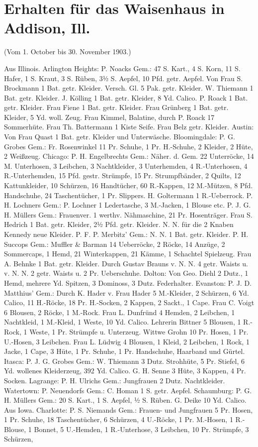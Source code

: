 \chapter[Waisenhaus in Addison]{Erhalten für das Waisenhaus in Addison, Ill.}

(Vom 1. October bis 30. November 1903.)

Aus Illinois. Arlington Heights: P. Noacks Gem.: 47 S. Kart., 4 S. Korn, 11 S. Hafer, 1 S. Kraut, 3 S. Rüben, 3½ S. Aepfel, 10 Pfd. getr. Aepfel. Von Frau S. Brockmann 1 Bat. getr. Kleider. Versch. Gl. 5 Pak. getr. Kleider. W. Thiemann 1 Bat. getr. Kleider. J. Kölling 1 Bat. getr. Kleider, 8 Yd. Calico. P. Roack 1 Bat. getr. Kleider. Frau Fiene 1 Bat. getr. Kleider. Frau Grünberg 1 Bat. getr. Kleider, 5 Yd. woll. Zeug. Frau Kimmel, Balatine, durch P. Roack 17 Sommerhüte. Frau Th. Battermann 1 Kiste Seife. Frau Belz getr. Kleider. Austin: Von Frau Quast 1 Bat. getr. Kleider und Unterwäsche. Bloomingdale: P. G. Grobes Gem.: Fr. Rosenwinkel 11 Pr. Schuhe, 1 Pr. H.-Schuhe, 2 Kleider, 2 Hüte, 2 Weißzeug. Chicago: P. H. Engelbrechts Gem.: Näher. d. Gem. 22 Unterröcke, 14 M. Unterhosen, 3 Leibchen, 3 Nachtkleider, 3 Unterhemden, 4 R.-Unterhosen, 4 R.-Unterhemden, 15 Pfd. gestr. Strümpfe, 15 Pr. Strumpfbänder, 2 Quilts, 12 Kattunkleider, 10 Schürzen, 16 Handtücher, 60 R.-Kappen, 12 M.-Mützen, 8 Pfd. Handschuhe, 24 Taschentücher, 1 Pr. Slippers. H. Goltermann 1 R.-Ueberrock. P. H. Lochners Gem.: P. Lochner 1 Ledertasche, 3 M.-Jacken, 1 Blouse etc. P. J. G. H. Müllers Gem.: Frauenver. 1 werthv. Nähmaschine, 21 Pr. Hosenträger. Frau S. Hedrich 1 Bat. getr. Kleider, 2½ Pfd. getr. Kleider. N. N. für die 2 Knaben Kennedy neue Kleider. P. F. P. Merbitz’ Gem.: N. N. 1 Bat. getr. Kleider. P. H. Succops Gem.: Muffler \& Barman 14 Ueberröcke, 2 Röcke, 14 Anzüge, 2 Sommercaps, 1 Hemd, 21 Winterkappen, 21 Kämme, 1 Schachtel Spielzeug. Frau A. Behnke 1 Bat. getr. Kleider. Durch Gustav Brauns v. N. N. 4 getr. Waists u. v. N. N. 2 getr. Waists u. 2 Pr. Ueberschuhe. Dolton: Von Geo. Diehl 2 Dutz., 1 Hemd, mehrere Yd. Spitzen, 3 Dominoss, 3 Dutz. Federhalter. Evanston: P. J. D. Matthius’ Gem.: Durch K. Hader v. Frau Hader 5 M.-Kleider, 2 Schürzen, 6 Yd. Calico, 11 H.-Röcke, 18 Pr. H.-Socken, 2 Kappen, 2 Sackt., 1 Cape. Frau C. Voigt 6 Blousen, 2 Röcke, 1 M.-Rock. Frau L. Dunfründ 4 Hemden, 2 Leibchen, 1 Nachtkleid, 1 M.-Kleid, 1 Weste, 10 Yd. Calico. Lehrerin Bittner 5 Blousen, 1 R.-Rock, 1 Weste, 1 Pr. Strümpfe u. Unterzeug. Wittwe Grohn 10 Pr. Hosen, 1 Pr. U.-Hosen, 3 Leibchen. Frau L. Lüdwig 4 Blousen, 1 Kleid, 2 Leibchen, 1 Rock, 1 Jacke, 1 Cape, 3 Hüte, 1 Pr. Schuhe, 1 Pr. Handschuhe, Haarband und Gürtel. Itasca: P. J. G. Grobes Gem.: W. Thiemann 3 Dutz. Strohhüte, 5 Pr. Stiefel, 6 Yd. wollenes Kleiderzeug, 392 Yd. Calico. G. H. Senne 3 Hüte, 3 Kappen, 4 Pr. Socken. Lagrange: P. H. Ulrichs Gem.: Jungfrauen 2 Dutz. Nachtkleider. Watertown: P. Neuendorfs Gem.: C. Homan 1 S. getr. Aepfel. Schaumburg: P. G. H. Müllers Gem.: 20 S. Kart., 1 S. Aepfel, ½ S. Rüben. G. Deike 10 Yd. Calico. Aus Iowa. Charlotte: P. S. Niemands Gem.: Frauen- und Jungfrauen 5 Pr. Hosen, 1 Pr. Schuhe, 18 Taschentücher, 6 Schürzen, 4 U.-Röcke, 1 Pr. M.-Hosen, 1 R.-Blouse, 1 Bonnet, 5 U.-Hemden, 1 R.-Unterhose, 3 Leibchen, 10 Pr. Strümpfe, 3 Schürzen, 